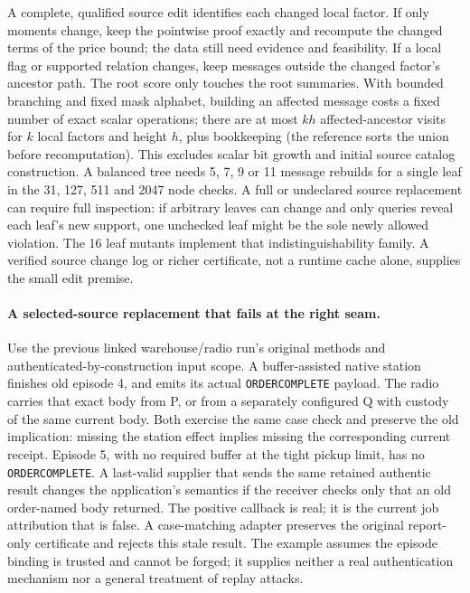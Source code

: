 \documentclass[11pt]{article}
\begin{document}
A complete, qualified source edit identifies each changed
local factor. If only moments change, keep the pointwise
proof exactly and recompute the changed terms of the
price bound; the data still need evidence and feasibility.
If a local flag or supported relation changes, keep messages
outside the changed factor's ancestor path. The root score
only touches the root summaries. With bounded branching
and fixed mask alphabet, building an affected message costs
a fixed number of exact scalar operations; there are at most
\(k h\) affected-ancestor visits for \(k\) local factors
and height \(h\), plus bookkeeping (the reference sorts
the union before recomputation). This excludes scalar bit
growth and initial source catalog construction. A balanced
tree needs 5, 7, 9 or 11 message rebuilds for a single leaf
in the 31, 127, 511 and 2047 node checks. A full or
undeclared source replacement can require full inspection:
if arbitrary leaves can change and only queries reveal
each leaf's new support, one unchecked leaf might be the
sole newly allowed violation. The 16 leaf mutants
implement that indistinguishability family. A verified
source change log or richer certificate, not a runtime
cache alone, supplies the small edit premise.

\paragraph{A selected-source replacement that fails at the right seam.}
Use the previous linked warehouse/radio run's original
methods and authenticated-by-construction input scope.
A buffer-assisted native station finishes old episode 4,
and emits its actual \texttt{ORDERCOMPLETE} payload.
The radio carries that exact body from P, or from a
separately configured Q with custody of the same current
body. Both exercise the same case check and preserve
the old implication: missing the station effect implies
missing the corresponding current receipt.
Episode 5, with no required buffer at the tight
pickup limit, has no \texttt{ORDERCOMPLETE}. A last-valid
supplier that sends the same retained authentic result
changes the application's semantics if the receiver checks
only that an old order-named body returned. The positive
callback is real; it is the current job attribution that is
false. A case-matching adapter preserves the original
report-only certificate and rejects this stale result.
The example assumes the episode binding is trusted and
cannot be forged; it supplies neither a real authentication
mechanism nor a general treatment of replay attacks.
\end{document}
